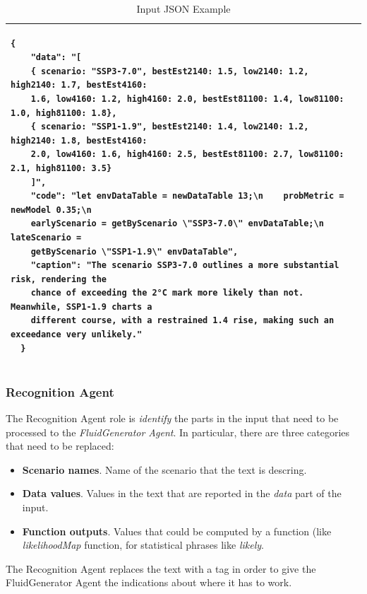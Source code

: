 \begin{table}[!ht]
    \centering
    \caption{Input JSON Example \label{tab:json_fluid_input}}
    \begin{tabular}{p{13cm}}
    \hline
    \hline
    \begin{verbatim}
{
    "data": "[
    { scenario: "SSP3-7.0", bestEst2140: 1.5, low2140: 1.2, high2140: 1.7, bestEst4160:
    1.6, low4160: 1.2, high4160: 2.0, bestEst81100: 1.4, low81100: 1.0, high81100: 1.8},
    { scenario: "SSP1-1.9", bestEst2140: 1.4, low2140: 1.2, high2140: 1.8, bestEst4160:
    2.0, low4160: 1.6, high4160: 2.5, bestEst81100: 2.7, low81100: 2.1, high81100: 3.5}
    ]",
    "code": "let envDataTable = newDataTable 13;\n    probMetric = newModel 0.35;\n
    earlyScenario = getByScenario \"SSP3-7.0\" envDataTable;\n    lateScenario =
    getByScenario \"SSP1-1.9\" envDataTable",
    "caption": "The scenario SSP3-7.0 outlines a more substantial risk, rendering the
    chance of exceeding the 2°C mark more likely than not. Meanwhile, SSP1-1.9 charts a
    different course, with a restrained 1.4 rise, making such an exceedance very unlikely."
  }
\end{verbatim}\\
    \hline \hline
    \end{tabular}
\end{table}

\subsubsection{Recognition Agent}
The Recognition Agent role is \textit{identify} the parts in the input that need to be processed to the \textit{FluidGenerator Agent}. In particular, there are three categories that need to be replaced:
\begin{itemize}
    \item \textbf{Scenario names}. Name of the scenario that the text is descring.
    \item \textbf{Data values}. Values in the text that are reported in the \textit{data} part of the input.
    \item \textbf{Function outputs}. Values that could be computed by a function (like \textit{likelihoodMap} function, for statistical phrases like \textit{likely}.
\end{itemize}

The Recognition Agent replaces the text with a tag in order to give the FluidGenerator Agent the indications about where it has to work.

